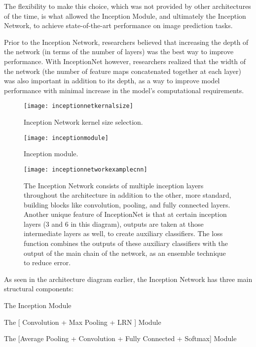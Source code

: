 \begin{bulletedlist}
		\item The flexibility to make this choice, which was not provided by other architectures of the time, is what allowed the Inception Module, and ultimately the Inception Network, to achieve state-of-the-art performance on image prediction tasks.
		\item Prior to the Inception Network, researchers believed that increasing the depth of the network  (in terms of the number of layers) was the best way to improve performance.  With InceptionNet however, researchers realized that the width of the network (the number of feature maps concatenated together at each layer) was also important in addition to its depth, as a way to improve model performance with minimal increase in the model's computational requirements.
	\end{bulletedlist}

	\begin{figure}[tbh]
		\centering
		\texttt{[image: inceptionnetkernalsize]}
		\caption[Inception Network kernel size selection]{Inception Network kernel size selection.}
		\label{fig:inceptionnetkernalsize}
	\end{figure}

	\begin{figure}[tbh]
		\centering
		\texttt{[image: inceptionmodule]}
		\caption[Inception module]{Inception module.}
		\label{fig:inceptionmodule}
	\end{figure}

	\begin{figure}[tbh]
		\centering
		\texttt{[image: inceptionnetworkexamplecnn]}
		\caption[Inception Network architecture]{The Inception Network consists of multiple inception layers throughout the architecture in addition to the other, more standard, building blocks like convolution, pooling, and fully connected layers.  Another unique feature of InceptionNet is that at certain inception layers (3 and 6 in this diagram), outputs are taken at those intermediate layers as well, to create auxiliary classifiers.  The loss function combines the outputs of these auxiliary classifiers with the output of the main chain of the network, as an ensemble technique to reduce error.}
		\label{fig:inceptionnetworkexamplecnn}
	\end{figure}

	\begin{bulletedlist}
		\item As seen in the architecture diagram earlier, the Inception Network has three main structural components:
		\begin{bulletedlist}
			\item The Inception Module
			\item The [ Convolution + Max Pooling + LRN ] Module
			\item The [Average Pooling + Convolution + Fully Connected + Softmax] Module
		\end{bulletedlist}
	\end{bulletedlist}

